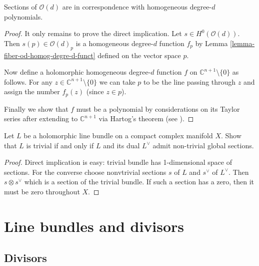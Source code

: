 \begin{theorem}
\label{theorem-secti-od-degre-d-homog-poly}
Sections of $\mathcal{O}(d)$ are in
correspondence with homogeneous degree-$d$
polynomials.
\end{theorem}

\begin{proof}
It only remains to prove the direct
implication.
Let $s \in H^0(\mathcal{O}(d))$.
Then $s(p) \in \mathcal{O}(d)_p$ is a
homogeneous degree-$d$ function $f_p$
by Lemma
\ref{lemma-fiber-od-homog-degre-d-funct}
defined on the vector space $p$.

Now define a holomorphic homogeneous
degree-$d$ function $f$ on
$\mathbb{C}^{n+1}\setminus\{0\}$ as follows.
For any $z \in
\mathbb{C}^{n+1}\setminus\{0\}$ we can take
$p$
to be the line passing through $z$
and assign the number $f_p(z)$
(since $z \in p$).

Finally we show that $f$ must be a polynomial
by considerations on its Taylor series
after extending to $\mathbb{C}^{n+1}$ via
Hartog's theorem
(see \cite[Theorem 3.36]{lec}).
\end{proof}


\begin{exercise}
\label{exercise-line-bundle-trivial-iff}
\begin{reference}
\cite[Exercise 2.2.5]{huc}
\end{reference}
Let $L$ be a holomorphic line bundle on a
compact complex manifold $X$.
Show that $L$ is trivial if and only if $L$
and its dual $L^\vee$
admit non-trivial global sections.
\end{exercise}

\begin{proof}
Direct implication is easy: trivial bundle
has 1-dimensional space of sections.
For the converse choose nonvtrivial sections
$s$ of $L$
and $s^\vee$ of $L^\vee$.
Then $s \otimes s^\vee$ which is a section
of the trivial bundle.
If such a section has a zero, then it must be
zero throughout $X$.
\end{proof}

\section{Line bundles and divisors}
\label{section-line-bundles}

\subsection{Divisors}
\label{subsection-divisors}


